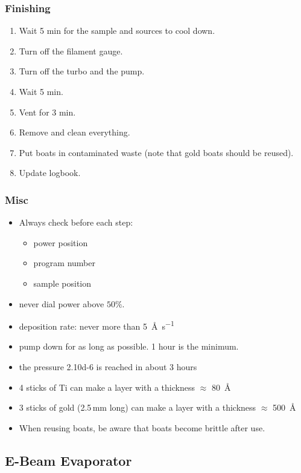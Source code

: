\subsubsection{Finishing}
\begin{enumerate}[resume]
\item Wait 5 min for the sample and sources to cool down.
\item Turn off the filament gauge.
\item Turn off the turbo and the pump.
\item Wait 5 min.
\item Vent for 3 min.
\item Remove and clean everything.
\item Put boats in contaminated waste (note that gold boats should be reused).
\item Update logbook.
\end{enumerate}

\subsubsection{Misc}
\begin{itemize}
\item Always check before each step:
\begin{itemize}[noitemsep,nolistsep]
  \item power position
  \item program number
  \item sample position
\end{itemize}
\item never dial power above $50\%$.
\item deposition rate: never more than \SI{5}{\angstrom\per\second}
\item pump down for as long as possible. 1 hour is the minimum.
\item the pressure \SI{2.10d-6}{\torr} is reached in about 3 hours
\item 4 sticks of Ti can make a layer with a thickness $\approx$ \SI{80}{\angstrom}
\item 3 sticks of gold (2.5\,mm long) can make a layer with a thickness $\approx$ \SI{500}{\angstrom}
\item When reusing boats, be aware that boats become brittle after use.
\end{itemize}

\newpage

\subsection{E-Beam Evaporator}
